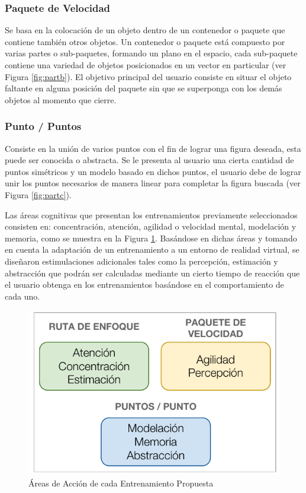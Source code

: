 \documentclass[conference]{IEEEtran}
\begin{document}
\subsubsection*{\textbf{Paquete de Velocidad}}

Se basa en la colocación de un objeto dentro de un contenedor o paquete que contiene también otros objetos. Un contenedor o paquete está compuesto por varias partes o sub-paquetes, formando un plano en el espacio, cada sub-paquete contiene una variedad de objetos posicionados en un vector en particular (ver Figura \ref{fig:partb}). El objetivo principal del usuario consiste en situar el objeto faltante en alguna posición del paquete sin que se superponga con los demás objetos al momento que cierre. 

\subsubsection*{\textbf{Punto / Puntos}}

Consiste en la unión de varios puntos con el fin de lograr una figura deseada, esta puede ser conocida o abstracta. Se le presenta al usuario una cierta cantidad de puntos simétricos y un modelo basado en dichos puntos, el usuario debe de lograr unir los puntos necesarios de manera linear para completar la figura buscada (ver Figura \ref{fig:partc}).

Las áreas cognitivas que presentan los entrenamientos previamente seleccionados consisten en: concentración, atención, agilidad o velocidad mental, modelación y memoria, como se muestra en la Figura \ref{fig:methods}. Basándose en dichas áreas y tomando en cuenta la adaptación de un entrenamiento a un entorno de realidad virtual, se diseñaron estimulaciones adicionales tales como la percepción, estimación y abstracción que podrán ser calculadas mediante un cierto tiempo de reacción que el usuario obtenga en los entrenamientos basándose en el comportamiento de cada uno.

\begin{figure}[htpb!]
 \centering 
\includegraphics[width=1.0\columnwidth]{images/methods.pdf}
\caption{Áreas de Acción de cada Entrenamiento Propuesta}
\label{fig:methods}
\end{figure}
\end{document}
